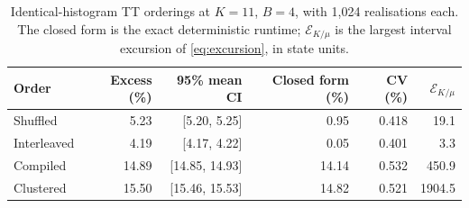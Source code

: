 \begin{table}[htbp]
\centering\small
\begin{tabular}{lrrrrr}
\toprule
Order & Excess (\%) & 95\% mean CI & Closed form (\%) & CV (\%) & $\mathcal E_{K/\mu}$\\\midrule
Shuffled & 5.23 & [5.20, 5.25] & 0.95 & 0.418 & 19.1\\
Interleaved & 4.19 & [4.17, 4.22] & 0.05 & 0.401 & 3.3\\
Compiled & 14.89 & [14.85, 14.93] & 14.14 & 0.532 & 450.9\\
Clustered & 15.50 & [15.46, 15.53] & 14.82 & 0.521 & 1904.5\\
\bottomrule
\end{tabular}
\caption{Identical-histogram TT orderings at $K=11$, $B=4$, with 1,024 realisations each. The closed form is the exact deterministic runtime; $\mathcal E_{K/\mu}$ is the largest interval excursion of \eqref{eq:excursion}, in state units.}
\label{tab:order}
\end{table}

